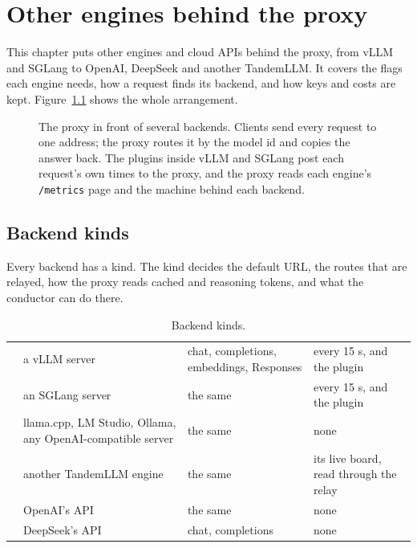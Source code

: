 \chapter{Other engines behind the proxy}\label{ch:other-engines}

This chapter puts other engines and cloud APIs behind the proxy, from vLLM and SGLang to OpenAI, DeepSeek and another TandemLLM. It covers the flags each engine needs, how a request finds its backend, and how keys and costs are kept. Figure~\ref{fig:proxy-topology} shows the whole arrangement.

\begin{figure}[htbp]
\centering

\caption[The proxy in front of several backends]{The proxy in front of several backends. Clients send every request to one address; the proxy routes it by the model id and copies the answer back. The plugins inside vLLM and SGLang post each request's own times to the proxy, and the proxy reads each engine's \texttt{/metrics} page and the machine behind each backend.}\label{fig:proxy-topology}
\end{figure}

\section{Backend kinds}

Every backend has a kind. The kind decides the default URL, the routes that are relayed, how the proxy reads cached and reasoning tokens, and what the conductor can do there.

\begin{table}[htbp]
\centering\small
\caption{Backend kinds.}\label{tab:backend-kinds}
\begin{tabularx}{\linewidth}{@{}L{.13\linewidth}L{.26\linewidth}L{.24\linewidth}Y@{}}
\toprule
{} &  &  &  \\
\midrule
{} & a vLLM server & chat, completions, embeddings, Responses &  every 15 s, and the plugin \\
 & an SGLang server & the same &  every 15 s, and the plugin \\
 & llama.cpp, LM Studio, Ollama, any OpenAI-compatible server & the same & none \\
 & another TandemLLM engine & the same & its live board, read through the relay \\
 & OpenAI's API & the same & none \\
 & DeepSeek's API & chat, completions & none \\
\bottomrule
\end{tabularx}
\end{table}

